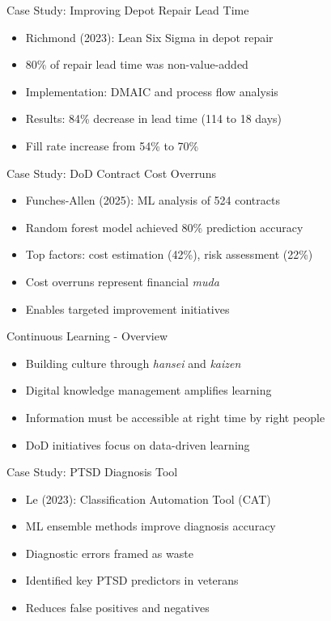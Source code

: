 \documentclass[aspectratio=169,11pt,xcolor={dvipsnames},hyperref={pdftex,pdfpagemode=UseNone,hidelinks,pdfdisplaydoctitle=true},usepdftitle=false]{beamer}
\begin{document}
    \begin{frame}{Case Study: Improving Depot Repair Lead Time}
      \begin{itemize}
        \item Richmond (2023): Lean Six Sigma in depot repair
        \item 80\% of repair lead time was non-value-added
        \item Implementation: DMAIC and process flow analysis
        \item Results: 84\% decrease in lead time (114 to 18 days)
        \item Fill rate increase from 54\% to 70\%
      \end{itemize}
    \end{frame}

    \begin{frame}{Case Study: DoD Contract Cost Overruns}
      \begin{itemize}
        \item Funches-Allen (2025): ML analysis of 524 contracts
        \item Random forest model achieved 80\% prediction accuracy
        \item Top factors: cost estimation (42\%), risk assessment (22\%)
        \item Cost overruns represent financial \textit{muda}
        \item Enables targeted improvement initiatives
      \end{itemize}
    \end{frame}

    \begin{frame}{Continuous Learning - Overview}
      \begin{itemize}
        \item Building culture through \textit{hansei} and \textit{kaizen}
        \item Digital knowledge management amplifies learning
        \item Information must be accessible at right time by right people
        \item DoD initiatives focus on data-driven learning
      \end{itemize}
    \end{frame}

    \begin{frame}{Case Study: PTSD Diagnosis Tool}
      \begin{itemize}
        \item Le (2023): Classification Automation Tool (CAT)
        \item ML ensemble methods improve diagnosis accuracy
        \item Diagnostic errors framed as waste
        \item Identified key PTSD predictors in veterans
        \item Reduces false positives and negatives
      \end{itemize}
    \end{frame}
\end{document}
